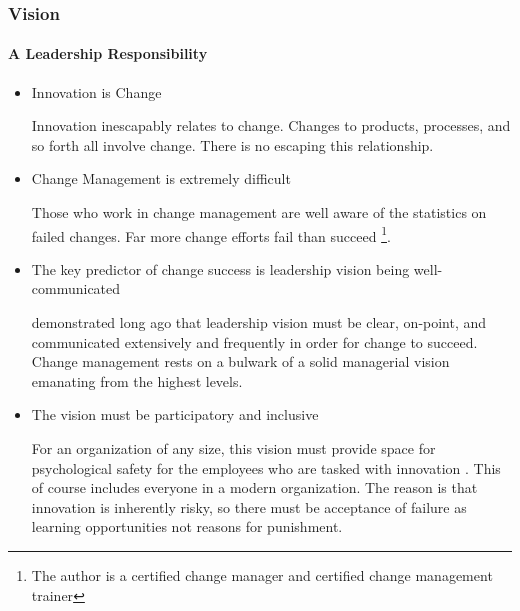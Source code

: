 \begin{frame}
  \frametitle{Vision}
  \framesubtitle{A Leadership Responsibility}
  \begin{itemize}
    \item<1-> Innovation is Change

      {\scriptsize{Innovation inescapably relates to change. Changes to products, processes, and so forth all involve change. There is no escaping this relationship.}}

    \item<2-> Change Management is extremely difficult

           {\scriptsize{Those who work in change management are well aware of the statistics on failed changes. Far more change efforts fail than succeed \footnote{The author is a certified change manager and certified change management trainer}.}}

    \item<3-> The key predictor of change success is leadership vision being well-communicated

           {\scriptsize{\textcite{kotterLeadingChange2012} demonstrated long ago that leadership vision must be clear, on-point, and communicated extensively and frequently in order for change to succeed. Change management rests on a bulwark of a solid managerial vision emanating from the highest levels.}}

    \item<4-> The vision must be participatory and inclusive

           {\scriptsize{For an organization of any size, this vision must provide space for psychological safety for the employees who are tasked with innovation \parencite{anderssonOrganizationalClimatePsychological2020}. This of course includes everyone in a modern organization. The reason is that innovation is inherently risky, so there must be acceptance of failure as learning opportunities not reasons for punishment.}}

  \end{itemize}
\end{frame}
